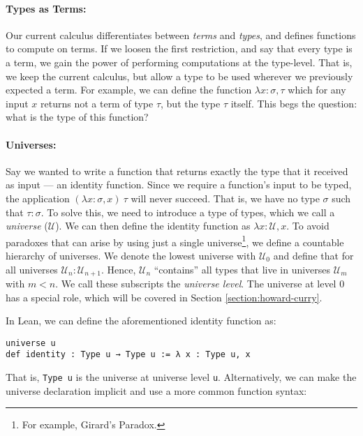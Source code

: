 \paragraph{Types as Terms:}

Our current calculus differentiates between \emph{terms} and \emph{types}, and defines functions to compute on terms.
If we loosen the first restriction, and say that every type is a term, we gain the power of performing computations at the type-level.
That is, we keep the current calculus, but allow a type to be used wherever we previously expected a term.
For example, we can define the function $\lambda x : \sigma, \tau$ which for any input $x$ returns not a term of type $\tau$, but the type $\tau$ itself. 
This begs the question: what is the type of this function?

\paragraph{Universes:}

Say we wanted to write a function that returns exactly the type that it received as input --- an identity function.
Since we require a function's input to be typed, the application $(\lambda x : \sigma, x)\ \tau$ will never succeed.
That is, we have no type $\sigma$ such that $\tau : \sigma$.
To solve this, we need to introduce a type of types, which we call a \emph{universe} ($\mathcal{U}$).
We can then define the identity function as $\lambda x : \mathcal{U}, x$.
To avoid paradoxes that can arise by using just a single universe\footnote{For example, Girard's Paradox.}, we define a countable hierarchy of universes.
We denote the lowest universe with $\mathcal{U}_0$ and define that for all universes $\mathcal{U}_n : \mathcal{U}_{n+1}$.
Hence, $\mathcal{U}_n$ ``contains'' all types that live in universes $\mathcal{U}_{m}$ with $m < n$.
We call these subscripts the \emph{universe level}.
The universe at level $0$ has a special role, which will be covered in Section \ref{section:howard-curry}. 

\vspace{3mm}

\noindent In Lean, we can define the aforementioned identity function as:

\begin{lstlisting}
universe u
def identity : Type u → Type u := λ x : Type u, x
\end{lstlisting}

\noindent That is, \verb|Type u| is the universe at universe level \lstinline{u}.
Alternatively, we can make the universe declaration implicit and use a more common function syntax:

